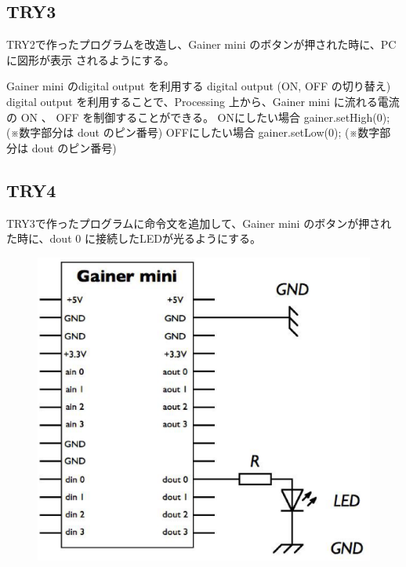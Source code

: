 \documentclass[11pt,a4paper]{jarticle}
\begin{document}
\subsection*{TRY3}
 TRY2で作ったプログラムを改造し、Gainer mini のボタンが押された時に、PCに図形が表示
されるようにする。

Gainer mini のdigital output を利用する
digital output (ON, OFF の切り替え)
 digital output を利用することで、Processing 上から、Gainer mini に流れる電流の ON 、
OFF を制御することができる。
ONにしたい場合
gainer.setHigh(0);
(※数字部分は dout のピン番号)
OFFにしたい場合
gainer.setLow(0);
(※数字部分は dout のピン番号)

\subsection*{TRY4}
 TRY3で作ったプログラムに命令文を追加して、Gainer mini のボタンが押された時に、dout 0
に接続したLEDが光るようにする。


\begin{figure}[h]
 \centering
 \includegraphics[width=0.5\columnwidth]{img/circuit.eps}
\end{figure}
\end{document}

